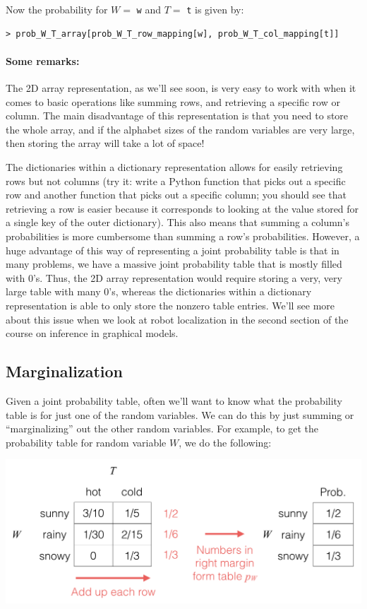 \documentclass[6008notes.tex]{subfiles}
\begin{document}
Now the probability for $W =$ \texttt{w} and $T =$ \texttt{t} is given by:

\begin{lstlisting}
> prob_W_T_array[prob_W_T_row_mapping[w], prob_W_T_col_mapping[t]]
\end{lstlisting}

\paragraph{Some remarks:} The 2D array representation, as we'll see soon, is very easy to work with when it comes to basic operations like summing rows, and retrieving a specific row or column. The main disadvantage of this representation is that you need to store the whole array, and if the alphabet sizes of the random variables are very large, then storing the array will take a lot of space!

The dictionaries within a dictionary representation allows for easily retrieving rows but not columns (try it: write a Python function that picks out a specific row and another function that picks out a specific column; you should see that retrieving a row is easier because it corresponds to looking at the value stored for a single key of the outer dictionary). This also means that summing a column's probabilities is more cumbersome than summing a row's probabilities. However, a huge advantage of this way of representing a joint probability table is that in many problems, we have a massive joint probability table that is mostly filled with 0's. Thus, the 2D array representation would require storing a very, very large table with many 0's, whereas the dictionaries within a dictionary representation is able to only store the nonzero table entries. We'll see more about this issue when we look at robot localization in the second section of the course on inference in graphical models.

\subsection{Marginalization}

Given a joint probability table, often we'll want to know what the probability table is for just one of the random variables. We can do this by just summing or ``marginalizing'' out the other random variables. For example, to get the probability table for random variable $W$, we do the following:

{\centering\includegraphics[scale=0.4]{images_sec-joint-rv-marg-rows} \par}
\end{document}
